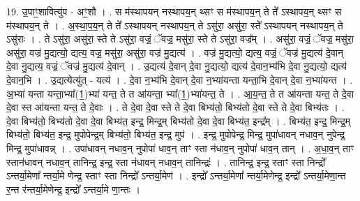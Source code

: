 \documentclass[17pt]{extarticle}
\begin{document}
19. उ॒पाꣳ॒॒शावित्यु॑प - अꣳ॒॒शौ । . स म॑स्थापयन् नस्थापय॒न् थ्सꣳ स म॑स्थापय॒न् ते ते᳚ ऽस्थापय॒न् थ्सꣳ स म॑स्थापय॒न् ते । . अ॒स्था॒प॒य॒न् ते ते᳚ ऽस्थापयन् नस्थापय॒न् ते ऽसु॑रा॒ असु॑रा॒ स्ते᳚ ऽस्थापयन् नस्थापय॒न् ते ऽसु॑राः । . ते ऽसु॑रा॒ असु॑रा॒ स्ते ते ऽसु॑रा॒ वज्रं॒ ॅवज्र॒ मसु॑रा॒ स्ते ते ऽसु॑रा॒ वज्र᳚म् । . असु॑रा॒ वज्रं॒ ॅवज्र॒ मसु॑रा॒ असु॑रा॒ वज्र॑ मु॒द्यत्यो॒ द्यत्य॒ वज्र॒ मसु॑रा॒ असु॑रा॒ वज्र॑ मु॒द्यत्य॑ । . वज्र॑ मु॒द्यत्यो॒ द्यत्य॒ वज्रं॒ ॅवज्र॑ मु॒द्यत्य॑ दे॒वान् दे॒वा नु॒द्यत्य॒ वज्रं॒ ॅवज्र॑ मु॒द्यत्य॑ दे॒वान् । . उ॒द्यत्य॑ दे॒वान् दे॒वा नु॒द्यत्यो॒ द्यत्य॑ दे॒वान॒भ्य॑भि दे॒वा नु॒द्यत्यो॒ द्यत्य॑ दे॒वान॒भि । . उ॒द्यत्येत्यु॑त् - यत्य॑ । . दे॒वा न॒भ्य॑भि दे॒वान् दे॒वा न॒भ्या॑यन्ता यन्ता॒भि दे॒वान् दे॒वा न॒भ्या॑यन्त । . अ॒भ्या॑ यन्ता यन्ता॒भ्या᳚(1॒)भ्या॑ यन्त॒ ते त आ॑यन्ता॒ भ्या᳚(1॒)भ्या॑यन्त॒ ते । . आ॒य॒न्त॒ ते त आ॑यन्ता यन्त॒ ते दे॒वा दे॒वा स्त आ॑यन्ता यन्त॒ ते दे॒वाः । . ते दे॒वा दे॒वा स्ते ते दे॒वा बिभ्य॑तो॒ बिभ्य॑तो दे॒वा स्ते ते दे॒वा बिभ्य॑तः । . दे॒वा बिभ्य॑तो॒ बिभ्य॑तो दे॒वा दे॒वा बिभ्य॑त॒ इन्द्र॒ मिन्द्र॒म् बिभ्य॑तो दे॒वा दे॒वा बिभ्य॑त॒ इन्द्र᳚म् । . बिभ्य॑त॒ इन्द्र॒ मिन्द्र॒म् बिभ्य॑तो॒ बिभ्य॑त॒ इन्द्र॒ मुपोपेन्द्र॒म् बिभ्य॑तो॒ बिभ्य॑त॒ इन्द्र॒ मुप॑ । . इन्द्र॒ मुपोपेन्द्र॒ मिन्द्र॒ मुपा॑धावन् नधाव॒न् नुपेन्द्र॒ मिन्द्र॒ मुपा॑धावन्न् । . उपा॑धावन् नधाव॒न् नुपोपा॑ धाव॒न् ताꣳ स्ता न॑धाव॒न् नुपोपा॑ धाव॒न् तान् । . अ॒धा॒व॒न् ताꣳ स्तान॑धावन् नधाव॒न् तानिन्द्र॒ इन्द्र॒ स्ता न॑धावन् नधाव॒न् तानिन्द्रः॑ । . तानिन्द्र॒ इन्द्र॒ स्ताꣳ स्ता निन्द्रो᳚ ऽन्तर्या॒मेणा᳚ न्तर्या॒मे णेन्द्र॒ स्ताꣳ स्ता निन्द्रो᳚ ऽन्तर्या॒मेण॑ । . इन्द्रो᳚ ऽन्तर्या॒मेणा᳚ न्तर्या॒मेणेन्द्र॒ इन्द्रो᳚ ऽन्तर्या॒मेणा॒न्त र॒न्त र॑न्तर्या॒मेणेन्द्र॒ इन्द्रो᳚ ऽन्तर्या॒मे णा॒न्तः । \newline
\end{document}
